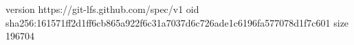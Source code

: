 version https://git-lfs.github.com/spec/v1
oid sha256:161571ff2d1ff6cb865a922f6c31a7037d6c726ade1c6196fa577078d1f7c601
size 196704
